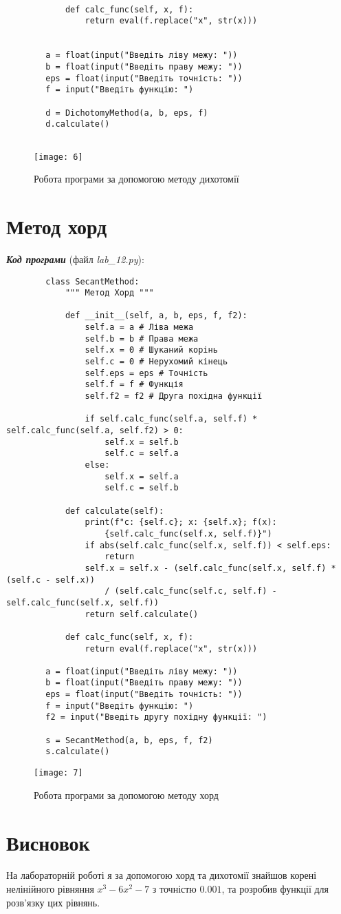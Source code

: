 \documentclass{article}
\begin{document}
\begin{normalsize}
\begin{lstlisting}
			
			def calc_func(self, x, f):
				return eval(f.replace("x", str(x)))
		
		
		a = float(input("Введіть ліву межу: "))
		b = float(input("Введіть праву межу: "))
		eps = float(input("Введіть точність: "))
		f = input("Введіть функцію: ")
		
		d = DichotomyMethod(a, b, eps, f)
		d.calculate()
		
	\end{lstlisting}
	
	\begin{figure}[h!]
		\centering
		\texttt{[image: 6]}
		\caption{Робота програми за допомогою методу дихотомії}
	\end{figure}
	
	\section*{Метод хорд}
	\textbf{\textit{Код програми}} (файл \textit{lab\_12.py}):
	\begin{lstlisting}		
		class SecantMethod:
			""" Метод Хорд """			
			
			def __init__(self, a, b, eps, f, f2):
				self.a = a # Ліва межа
				self.b = b # Права межа
				self.x = 0 # Шуканий корінь
				self.c = 0 # Нерухомий кінець
				self.eps = eps # Точність
				self.f = f # Функція
				self.f2 = f2 # Друга похідна функції
								
				if self.calc_func(self.a, self.f) * self.calc_func(self.a, self.f2) > 0:
					self.x = self.b
					self.c = self.a
				else:
					self.x = self.a
					self.c = self.b
						
			def calculate(self):
				print(f"c: {self.c}; x: {self.x}; f(x): 
					{self.calc_func(self.x, self.f)}")
				if abs(self.calc_func(self.x, self.f)) < self.eps: 
					return
				self.x = self.x - (self.calc_func(self.x, self.f) * (self.c - self.x)) 
					/ (self.calc_func(self.c, self.f) - self.calc_func(self.x, self.f))
				return self.calculate()
			
			def calc_func(self, x, f):
				return eval(f.replace("x", str(x)))
			
		a = float(input("Введіть ліву межу: "))
		b = float(input("Введіть праву межу: "))
		eps = float(input("Введіть точність: "))
		f = input("Введіть функцію: ")
		f2 = input("Введіть другу похідну функції: ")
		
		s = SecantMethod(a, b, eps, f, f2)
		s.calculate()
	\end{lstlisting}

	\begin{figure}[h!]
		\centering
		\texttt{[image: 7]}
		\caption{Робота програми за допомогою методу хорд}
	\end{figure}

	\section*{Висновок}
	На лабораторній роботі я за допомогою хорд та дихотомії знайшов корені нелінійного рівняння $x^3-6x^2-7$ з точністю $0.001$, та розробив функції для розв’язку цих рівнянь.
	    
\end{normalsize}
\end{document}
